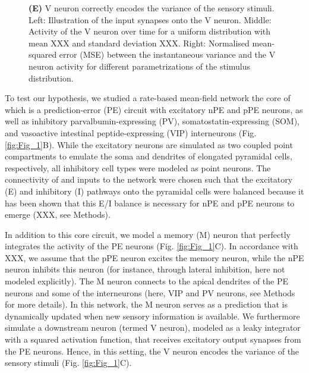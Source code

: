 \documentclass[10pt,a4paper]{article}
\begin{document}
\begin{figure}[t!]
{{\bf (E)} V neuron correctly encodes the variance of the sensory stimuli. Left: Illustration of the input synapses onto the V neuron. Middle: Activity of the V neuron over time for a uniform distribution with mean XXX and standard deviation XXX. Right: Normalised mean-squared error (MSE) between the instantaneous variance and the V neuron activity for different parametrizations of the stimulus distribution.
}
\label{fig:Fig_2}
\end{figure}
%

To test our hypothesis, we studied a rate-based mean-field network the core of which is a prediction-error (PE) circuit with excitatory nPE and pPE neurons, as well as inhibitory parvalbumin-expressing (PV), somatostatin-expressing (SOM), and vasoactive intestinal peptide-expressing (VIP) interneurons (Fig. \ref{fig:Fig_1}B). While the excitatory neurons are simulated as two coupled point compartments to emulate the soma and dendrites of elongated pyramidal cells, respectively, all inhibitory cell types were modeled as point neurons. The connectivity of and inputs to the network were chosen such that the excitatory (E) and inhibitory (I) pathways onto the pyramidal cells were balanced because it has been shown that this E/I balance is necessary for nPE and pPE neurons to emerge (XXX, see Methods). 

In addition to this core circuit, we model a memory (M) neuron that perfectly integrates the activity of the PE neurons (Fig. \ref{fig:Fig_1}C). In accordance with XXX, we assume that the pPE neuron excites the memory neuron, while the nPE neuron inhibits this neuron (for instance, through lateral inhibition, here not modeled explicitly). The M neuron connects to the apical dendrites of the PE neurons and some of the interneurons (here, VIP and PV neurons, see Methods for more details). In this network, the M neuron serves as a prediction that is dynamically updated when new sensory information is available. We furthermore simulate a downstream neuron (termed V neuron), modeled as a leaky integrator with a squared activation function, that receives excitatory output synapses from the PE neurons. Hence, in this setting, the V neuron encodes the variance of the sensory stimuli (Fig. \ref{fig:Fig_1}C). 
\end{document}
